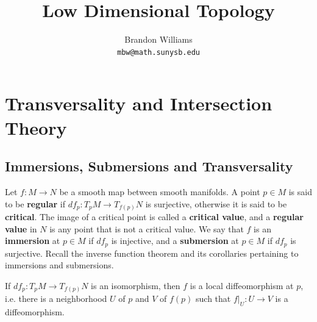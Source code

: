 









\title{\Large Low Dimensional Topology}
\author{Brandon Williams \\ \texttt{mbw@math.sunysb.edu}}
\maketitle


\tableofcontents








\newpage
\section{Transversality and Intersection Theory}
\label{Transversality and Intersection Theory}




\subsection{Immersions, Submersions and Transversality}
\label{Immersions, Submersions and Transversality}


Let $f : M \rightarrow N$ be a smooth map between smooth manifolds. A point $p \in M$ is said to be \textbf{regular} if $df_p : T_p M \rightarrow T_{f(p)} N$ is surjective, otherwise it is said to be \textbf{critical}. The image of a critical point is called a \textbf{critical value}, and a \textbf{regular value} in $N$ is any point that is not a critical value. We say that $f$ is an \textbf{immersion} at $p \in M$ if $df_p$ is injective, and a \textbf{submersion} at $p \in M$ if $df_p$ is surjective. Recall the inverse function theorem and its corollaries pertaining to immersions and submersions. 
\begin{thm}
If $df_p : T_p M \rightarrow T_{f(p)} N$ is an isomorphism, then $f$ is a local diffeomorphism at $p$, i.e. there is a neighborhood $U$ of $p$ and $V$ of $f(p)$ such that $f|_U : U \rightarrow V$ is a diffeomorphism.
\end{thm}

